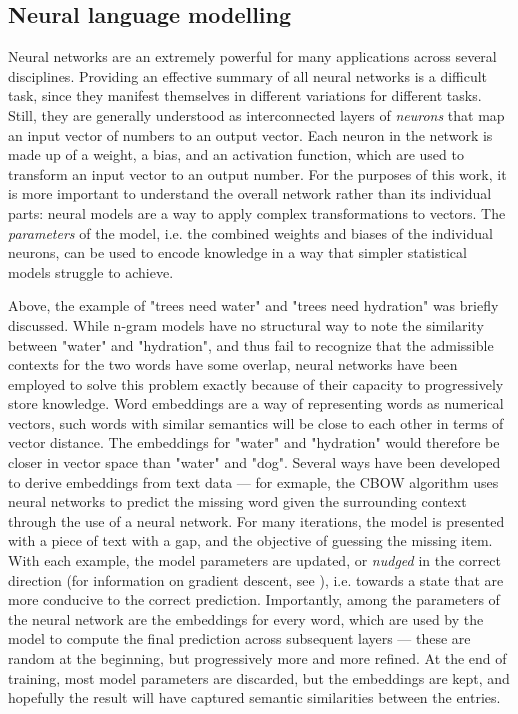\subsection{Neural language modelling}

Neural networks are an extremely powerful for many applications across several disciplines. Providing an effective summary of all neural networks is a difficult task, since they manifest themselves in different variations for different tasks.
Still, they are generally understood as interconnected layers of \emph{neurons} that map an input vector of numbers to an output vector. Each neuron in the network is made up of a weight, a bias, and an activation function, which are used to transform an input vector to an output number.
For the purposes of this work, it is more important to understand the overall network rather than its individual parts: neural models are a way to apply complex transformations to vectors.
The \emph{parameters} of the model, i.e. the combined weights and biases of the individual neurons, can be used to encode knowledge in a way that simpler statistical models struggle to achieve.

Above, the example of "trees need water" and "trees need hydration" was briefly discussed. While n-gram models have no structural way to note the similarity between "water" and "hydration", and thus fail to recognize that the admissible contexts for the two words have some overlap, neural networks have been employed to solve this problem exactly because of their capacity to progressively store knowledge.
Word embeddings \citep{selva2021review} are a way of representing words as numerical vectors, such words with similar semantics will be close to each other in terms of vector distance.  The embeddings for "water" and "hydration" would therefore be closer in vector space than "water" and "dog".
Several ways have been developed to derive embeddings from text data --- for exmaple, the CBOW \citep{mikolov2013efficientestimationwordrepresentations} algorithm uses neural networks to predict the missing word given the surrounding context through the use of a neural network.
For many iterations, the model is presented with a piece of text with a gap, and the objective of guessing the missing item. With each example, the model parameters are updated, or \emph{nudged} in the correct direction (for information on gradient descent, see \citealp{zhang2019gradientdescentbasedoptimization}), i.e. towards a state that are more conducive to the correct prediction.
Importantly, among the parameters of the neural network are the embeddings for every word, which are used by the model to compute the final prediction across subsequent layers --- these are random at the beginning, but progressively more and more refined.
At the end of training, most model parameters are discarded, but the embeddings are kept, and hopefully the result will have captured semantic similarities between the entries.

